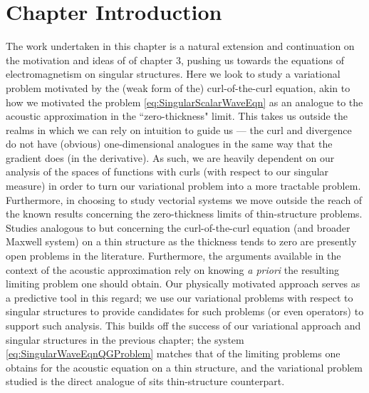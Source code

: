 \section{Chapter Introduction} \label{sec:Curl-Intro}
The work undertaken in this chapter is a natural extension and continuation on the motivation and ideas of of chapter 3, pushing us towards the equations of electromagnetism on singular structures.
Here we look to study a variational problem motivated by the (weak form of the) curl-of-the-curl equation, akin to how we motivated the problem \eqref{eq:SingularScalarWaveEqn} as an analogue to the acoustic approximation in the ``zero-thickness" limit.
This takes us outside the realms in which we can rely on intuition to guide us --- the curl and divergence do not have (obvious) one-dimensional analogues in the same way that the gradient does (in the derivative).
As such, we are heavily dependent on our analysis of the spaces of functions with curls (with respect to our singular measure) in order to turn our variational problem into a more tractable problem.
Furthermore, in choosing to study vectorial systems we move outside the reach of the known results concerning the zero-thickness limits of thin-structure problems.
Studies analogous to \cite{kuchment2001convergence, kuchment2003asymptotics, exner2005convergence, post2012spectral} but concerning the curl-of-the-curl equation (and broader Maxwell system) on a thin structure as the thickness tends to zero are presently open problems in the literature.
Furthermore, the arguments available in the context of the acoustic approximation rely on knowing \emph{a priori} the resulting limiting problem one should obtain.
Our physically motivated approach serves as a predictive tool in this regard; we use our variational problems with respect to singular structures to provide candidates for such problems (or even operators) to support such analysis.
This builds off the success of our variational approach and singular structures in the previous chapter; the system \eqref{eq:SingularWaveEqnQGProblem} matches that of the limiting problems one obtains for the acoustic equation on a thin structure, and the variational problem studied is the direct analogue of sits thin-structure counterpart.

